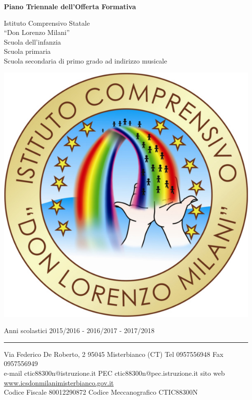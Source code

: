 \documentclass[12pt,a4paper]{article}
\begin{document}
\thispagestyle{empty}

{%
\sffamily
\centering

{\LARGE
\textbf{Piano Triennale dell'Offerta Formativa}
}

\vspace{1cm}

{\Huge
Istituto Comprensivo Statale}\\[1em]

{\Huge
``Don Lorenzo Milani''}\\[1em]

{\normalsize
Scuola dell'infanzia\\%
Scuola primaria\\%
Scuola secondaria di primo grado ad indirizzo musicale\\%
}

\vspace{1cm}

\includegraphics[scale=.8]{logo-don-milani-medium.jpg}

\vspace{2cm}

Anni scolastici 2015/2016 - 2016/2017 - 2017/2018

\vspace{0.8cm}


\hrule
\vspace{0.3cm}

{\scriptsize
Via Federico De Roberto, 2
95045  Misterbianco (CT)
Tel 0957556948
Fax 0957556949\\
e-mail ctic88300n@istruzione.it
PEC ctic88300n@pec.istruzione.it
sito web \href{http://www.icsdonmilanimisterbianco.gov.it}{www.icsdonmilanimisterbianco.gov.it}\\
Codice Fiscale 80012290872 
Codice Meccanografico CTIC88300N\\
}
}%
\end{document}
